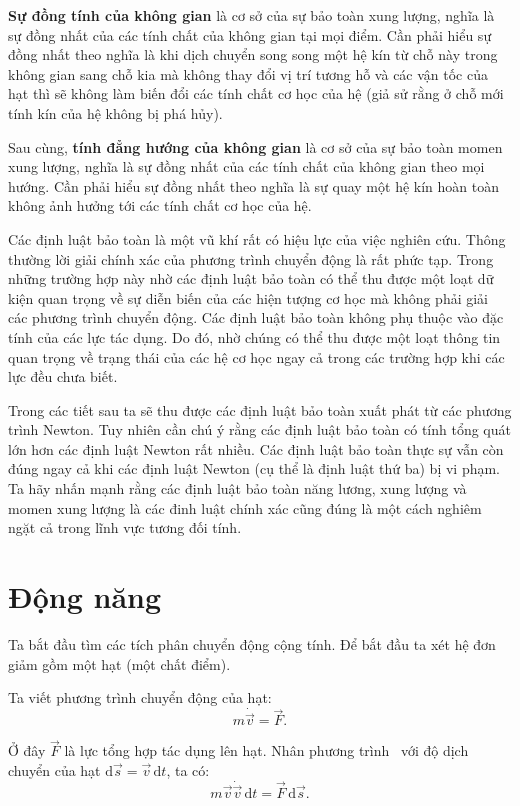\textbf{Sự đồng tính của không gian} là cơ sở của sự bảo toàn xung lượng, nghĩa là sự đồng nhất của các tính chất của không gian tại mọi điểm. Cần phải hiểu sự đồng nhất theo nghĩa là khi dịch chuyển song song một hệ kín từ chỗ này trong không gian sang chỗ kia mà không thay đổi vị trí tương hỗ và các vận tốc của hạt thì sẽ không làm biến đổi các tính chất cơ học của hệ (giả sử rằng ở chỗ mới tính kín của hệ không bị phá hủy). 

Sau cùng, \textbf{tính đẳng hướng của không gian} là cơ sở của sự bảo toàn momen xung lượng, nghĩa là sự đồng nhất của các tính chất của không gian theo mọi hướng. Cần phải hiểu sự đồng nhất theo nghĩa là sự quay một hệ kín hoàn toàn không ảnh hưởng tới các tính chất cơ học của hệ.

Các định luật bảo toàn là một vũ khí rất có hiệu lực của việc nghiên cứu. Thông thường lời giải chính xác của phương trình chuyển động là rất phức tạp. Trong những trường hợp này nhờ các định luật bảo toàn có thể thu được một loạt dữ kiện quan trọng về sự diễn biến của các hiện tượng cơ học mà không phải giải các phương trình chuyển động. Các định luật bảo toàn không phụ thuộc vào đặc tính của các lực tác dụng. Do đó, nhờ chúng có thể thu được một loạt thông tin quan trọng về trạng thái của các hệ cơ học ngay cả trong các trường hợp khi các lực đều chưa biết.

Trong các tiết sau ta sẽ thu được các định luật bảo toàn xuất phát từ các phương trình Newton. Tuy nhiên cần chú ý rằng các định luật bảo toàn có tính tổng quát lớn hơn các định luật Newton rất nhiều. Các định luật bảo toàn thực sự vẫn còn đúng ngay cả khi các định luật Newton (cụ thể là định luật thứ ba) bị vi phạm. Ta hãy nhấn mạnh rằng các định luật bảo toàn năng lương, xung lượng và momen xung lượng là các đinh luật chính xác cũng đúng là một cách nghiêm ngặt cả trong lĩnh vực tương đối tính.

\section{Động năng}\label{sec:3_2}

Ta bắt đầu tìm các tích phân chuyển động cộng tính. Để bắt đầu ta xét hệ đơn giảm gồm một hạt (một chất điểm).

Ta viết phương trình chuyển động của hạt:
\begin{equation}\label{eq:3_1}
m\dot{\vec{v}} = \vec{F}.
\end{equation}

\noindent
Ở đây $\vec{F}$ là lực tổng hợp tác dụng lên hạt. Nhân phương trình~ với độ dịch chuyển của hạt $\mathrm{d}\vec{s}=\vec{v}\,\mathrm{d}t$, ta có:
\begin{equation}\label{eq:3_2}
m\vec{v}\dot{\vec{v}}\,\mathrm{d}t = \vec{F}\,\mathrm{d}\vec{s}.
\end{equation}

